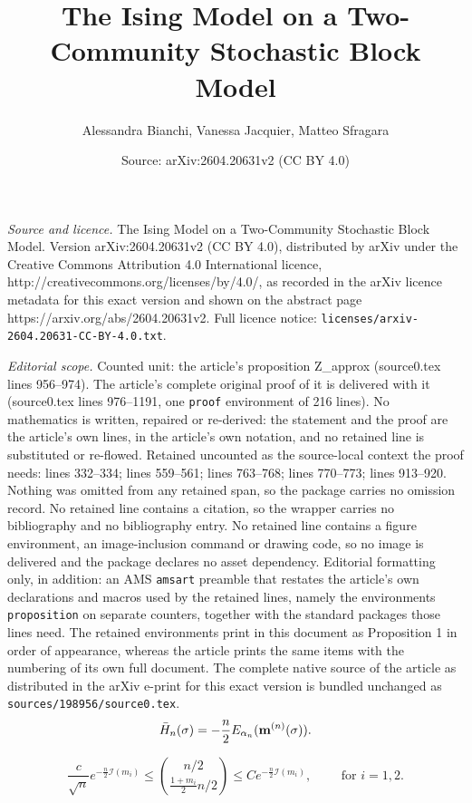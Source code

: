 \documentclass[10pt,a4paper]{amsart}
\title{The Ising Model on a Two-Community Stochastic Block Model}
\author{Alessandra Bianchi, Vanessa Jacquier, Matteo Sfragara}
\date{Source: arXiv:2604.20631v2 (CC BY 4.0)}
\def \bm {{\bf m}}
\def \s {{\sigma}}
\begin{document}
\maketitle

\noindent\emph{Source and licence.} The Ising Model on a Two-Community Stochastic Block Model. Version arXiv:2604.20631v2 (CC BY 4.0), distributed by arXiv under the Creative Commons Attribution 4.0 International licence, http://creativecommons.org/licenses/by/4.0/, as recorded in the arXiv licence metadata for this exact version and shown on the abstract page https://arxiv.org/abs/2604.20631v2. Full licence notice: \texttt{licenses/arxiv-2604.20631-CC-BY-4.0.txt}.\par\smallskip

\noindent\textit{Editorial scope.} Counted unit: the article's proposition Z\_approx (source0.tex lines 956--974). The article's complete original proof of it is delivered with it (source0.tex lines 976--1191, one \texttt{proof} environment of 216 lines). No mathematics is written, repaired or re-derived: the statement and the proof are the article's own lines, in the article's own notation, and no retained line is substituted or re-flowed.  Retained uncounted as the source-local context the proof needs: lines 332--334; lines 559--561; lines 763--768; lines 770--773; lines 913--920.  Nothing was omitted from any retained span, so the package carries no omission record.  No retained line contains a citation, so the wrapper carries no bibliography and no bibliography entry.  No retained line contains a figure environment, an image-inclusion command or drawing code, so no image is delivered and the package declares no asset dependency.  Editorial formatting only, in addition: an AMS \texttt{amsart} preamble that restates the article's own declarations and macros used by the retained lines, namely the environments \texttt{proposition} on separate counters, together with the standard packages those lines need.  The retained environments print in this document as Proposition 1 in order of appearance, whereas the article prints the same items with the numbering of its own full document.  The complete native source of the article as distributed in the arXiv e-print for this exact version is bundled unchanged as \texttt{sources/198956/source0.tex}.
\begin{align}\label{def:hamiltonian_CW_magnet}
\bar{H}_n(\sigma)=-\frac{n}{2} E_{\alpha_n}(\bm^{(n)}(\s)).
\end{align}

\begin{equation}\label{StirBound}
\frac{c}{\sqrt{n}}e^{- \frac{n}{2}\mathcal{I}(m_i)}\le\binom{n/2}{\frac{1+m_i}{2} n/2}\le Ce^{- \frac{n}{2}\mathcal{I}(m_i)},\qquad \mbox{ for } i=1,2.
\end{equation}
\end{document}
